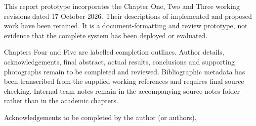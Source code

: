 This report prototype incorporates the Chapter One, Two and Three working
revisions dated 17 October 2026. Their descriptions of implemented and proposed
work have been retained. It is a document-formatting and review prototype,
not evidence that the complete system has been deployed or evaluated.

Chapters Four and Five are labelled completion outlines. Author details,
acknowledgements, final abstract, actual results, conclusions and supporting
photographs remain to be completed and reviewed. Bibliographic metadata has
been transcribed from the supplied working references and requires final
source checking. Internal team notes remain in the accompanying source-notes
folder rather than in the academic chapters.
\begin{acknowledgements}
Acknowledgements to be completed by the author (or authors).
\end{acknowledgements}
\reportlists%
\begin{abstract}
\textbf{Abstract pending.} Write the final abstract after the implemented scope,
evaluation datasets, measured results and conclusions have been reconciled.
Summarise the records-management problem, integrated design, methods, principal
results and limitations. No measured result has been invented for this prototype.
\end{abstract}

